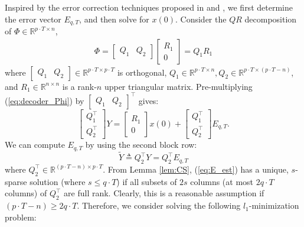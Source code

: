 \documentclass[12pt, conference, a4paper, twoside]{IEEEconf_mod}
\begin{document}
Inspired by the error correction techniques proposed in \cite{Candes_Tao} and \cite{David_Chang}, we first determine the error vector $E_{q,T}$, and then solve for $x(0)$. %
Consider the $QR$ decomposition of $\Phi \in \mathbb{R}^{p\cdot T \times n}$,
\begin{eqnarray}
	\Phi = \begin{bmatrix} Q_1 & Q_2 \end{bmatrix} \begin{bmatrix} R_1 \\ 0 \end{bmatrix} = Q_1 R_1
\end{eqnarray}
where $\begin{bmatrix} Q_1 & Q_2 \end{bmatrix} \in \mathbb{R}^{p\cdot T \times p\cdot T}$ is orthogonal, $Q_1 \in \mathbb{R}^{p\cdot T\times n}, Q_2 \in \mathbb{R}^{p\cdot T \times (p\cdot T-n)}$, and $R_1 \in \mathbb{R}^{n\times n}$ is a rank-$n$ upper triangular matrix.
Pre-multiplying (\ref{eq:decoder_Phi}) by $\begin{bmatrix} Q_1 & Q_2 \end{bmatrix} ^\top$ gives:
\begin{equation}
	\begin{bmatrix} Q_1 ^\top \\ Q_2 ^\top \end{bmatrix} Y = \begin{bmatrix}R_1 \\ 0  \end{bmatrix} x(0) + \begin{bmatrix} Q_1 ^\top \\ Q_2^\top \end{bmatrix} E_{q,T}.
	\label{eq:QR}
\end{equation}
We can compute $E_{q,T}$ by using the second block row:
\begin{equation}
	\tilde Y \triangleq Q_2^\top Y = Q_2^\top E_{q,T}
	\label{eq:E_est}
\end{equation}
where $Q_2^\top \in \mathbb {R} ^{ (p\cdot T-n) \times p\cdot T}$.
From Lemma \ref{lem:CS}, (\ref{eq:E_est}) has a unique, $s$-sparse solution (where $s\le q\cdot T$) if all subsets of $2s$ columns (at most $2 q\cdot T$ columns) of $Q_2^\top$ are full rank. Clearly, this is a reasonable assumption if $(p\cdot T-n) \ge 2q\cdot T$. Therefore, we consider solving the following $l_1$-minimization problem:
\end{document}

